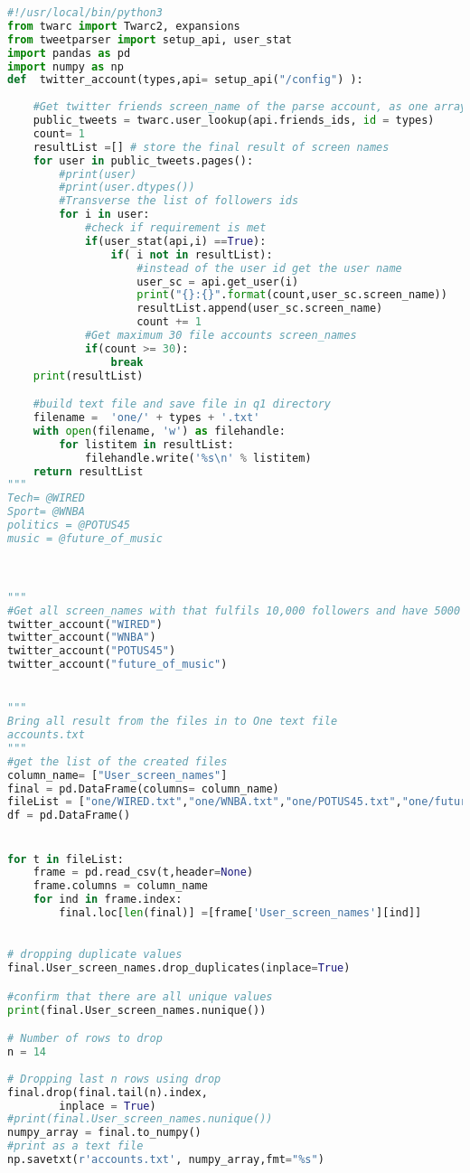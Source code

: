 \documentclass[12pt]{article}
\begin{document}
\begin{lstlisting}[language=Python, caption=twittergatherid.py , label=lst:copy]
#!/usr/local/bin/python3
from twarc import Twarc2, expansions
from tweetparser import setup_api, user_stat
import pandas as pd
import numpy as np
def  twitter_account(types,api= setup_api("/config") ):
    
    #Get twitter friends screen_name of the parse account, as one arrayList
    public_tweets = twarc.user_lookup(api.friends_ids, id = types)
    count= 1
    resultList =[] # store the final result of screen names
    for user in public_tweets.pages():
        #print(user)
        #print(user.dtypes())
        #Transverse the list of followers ids
        for i in user:
            #check if requirement is met
            if(user_stat(api,i) ==True):
                if( i not in resultList):   
                    #instead of the user id get the user name
                    user_sc = api.get_user(i)
                    print("{}:{}".format(count,user_sc.screen_name))
                    resultList.append(user_sc.screen_name)
                    count += 1                    
            #Get maximum 30 file accounts screen_names
            if(count >= 30):
                break
    print(resultList)

    #build text file and save file in q1 directory
    filename =  'one/' + types + '.txt'
    with open(filename, 'w') as filehandle:
        for listitem in resultList:
            filehandle.write('%s\n' % listitem)
    return resultList
"""
Tech= @WIRED
Sport= @WNBA
politics = @POTUS45
music = @future_of_music



"""
#Get all screen_names with that fulfils 10,000 followers and have 5000 tweets and verified
twitter_account("WIRED")
twitter_account("WNBA")
twitter_account("POTUS45")
twitter_account("future_of_music")


"""
Bring all result from the files in to One text file 
accounts.txt
"""
#get the list of the created files
column_name= ["User_screen_names"]
final = pd.DataFrame(columns= column_name)
fileList = ["one/WIRED.txt","one/WNBA.txt","one/POTUS45.txt","one/future_of_music.txt"]
df = pd.DataFrame()


for t in fileList:
    frame = pd.read_csv(t,header=None)
    frame.columns = column_name
    for ind in frame.index:
        final.loc[len(final)] =[frame['User_screen_names'][ind]]
        

# dropping duplicate values
final.User_screen_names.drop_duplicates(inplace=True)  

#confirm that there are all unique values 
print(final.User_screen_names.nunique())

# Number of rows to drop
n = 14
  
# Dropping last n rows using drop
final.drop(final.tail(n).index,
        inplace = True)
#print(final.User_screen_names.nunique())
numpy_array = final.to_numpy()
#print as a text file 
np.savetxt(r'accounts.txt', numpy_array,fmt="%s")


\end{lstlisting}
\end{document}
